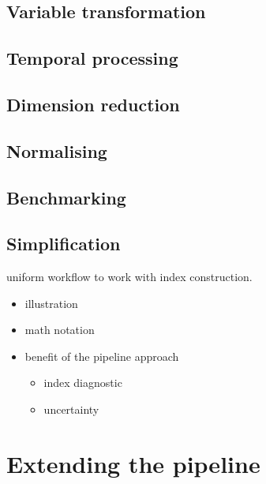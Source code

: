 \documentclass[
]{article}
\providecommand{\tightlist}{%
  \setlength{\itemsep}{0pt}\setlength{\parskip}{0pt}}\usepackage{longtable,booktabs,array}
\begin{document}
\hypertarget{variable-transformation}{%
\subsection{Variable transformation}\label{variable-transformation}}

\hypertarget{temporal-processing}{%
\subsection{Temporal processing}\label{temporal-processing}}

\hypertarget{dimension-reduction}{%
\subsection{Dimension reduction}\label{dimension-reduction}}

\hypertarget{normalising}{%
\subsection{Normalising}\label{normalising}}

\hypertarget{benchmarking}{%
\subsection{Benchmarking}\label{benchmarking}}

\hypertarget{simplification}{%
\subsection{Simplification}\label{simplification}}

uniform workflow to work with index construction.

\begin{itemize}
\tightlist
\item
  illustration
\item
  math notation
\item
  benefit of the pipeline approach

  \begin{itemize}
  \tightlist
  \item
    index diagnostic
  \item
    uncertainty
  \end{itemize}
\end{itemize}

\hypertarget{extending-the-pipeline}{%
\section{Extending the pipeline}\label{extending-the-pipeline}}
\end{document}
